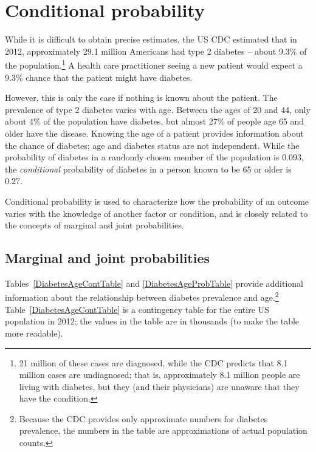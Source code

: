 \newpage

\section{Conditional probability}
\label{conditionalProbabilitySection}

While it is difficult to obtain precise estimates, the US CDC estimated that in 2012, approximately 29.1 million Americans had type 2 diabetes -- about 9.3\% of the population.\footnote{21 million of these cases are diagnosed, while the CDC predicts that 8.1 million cases are undiagnosed; that is, approximately 8.1 million people are living with diabetes, but they (and their physicians) are unaware that they have the condition.} A health care practitioner seeing a new patient would expect a 9.3\% chance that the patient might have diabetes. 

However, this is only the case if nothing is known about the patient. The prevalence of type 2 diabetes varies with age. Between the ages of 20 and 44, only about 4\% of the population have diabetes, but almost 27\% of people age 65 and older have the disease. Knowing the age of a patient provides information about the chance of diabetes; age and diabetes status are not independent. While the probability of diabetes in a randomly chosen member of the population is 0.093, the \textit{conditional} probability of diabetes in a person known to be 65 or older is 0.27.

Conditional probability is used to  characterize how the probability of an outcome varies with the knowledge of another factor or condition, and is closely related to the concepts of marginal and joint probabilities.

\subsection{Marginal and joint probabilities}
\label{marginalAndJointProbabilities}



Tables~\ref{DiabetesAgeContTable} and \ref{DiabetesAgeProbTable} provide additional information about the relationship between diabetes prevalence and age.\footnote{Because the CDC provides only approximate numbers for diabetes prevalence, the numbers in the table are approximations of actual population counts.} Table~\ref{DiabetesAgeContTable} is a contingency table for the entire US population in 2012; the values in the table are in thousands (to make the table more readable).  


